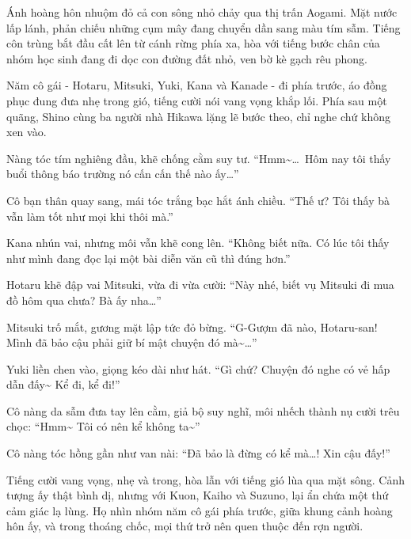 \documentclass[../main.tex]{subfiles}
\begin{document}

Ánh hoàng hôn nhuộm đỏ cả con sông nhỏ chảy qua thị trấn Aogami. Mặt nước lấp lánh, phản chiếu những cụm mây đang chuyển dần sang màu tím sẫm. Tiếng côn trùng bắt đầu cất lên từ cánh rừng phía xa, hòa với tiếng bước chân của nhóm học sinh đang đi dọc con đường đất nhỏ, ven bờ kè gạch rêu phong.

Năm cô gái - Hotaru, Mitsuki, Yuki, Kana và Kanade - đi phía trước, áo đồng phục đung đưa nhẹ trong gió, tiếng cười nói vang vọng khắp lối. Phía sau một quãng, Shino cùng ba người nhà Hikawa lặng lẽ bước theo, chỉ nghe chứ không xen vào.

Nàng tóc tím nghiêng đầu, khẽ chống cằm suy tư. ``Hmm\~{}\dots\ Hôm nay tôi thấy buổi thông báo trường nó cấn cấn thế nào ấy\dots''

Cô bạn thân quay sang, mái tóc trắng bạc hắt ánh chiều. ``Thế ư? Tôi thấy bà vẫn làm tốt như mọi khi thôi mà.''

Kana nhún vai, nhưng môi vẫn khẽ cong lên. ``Không biết nữa. Có lúc tôi thấy như mình đang đọc lại một bài diễn văn cũ thì đúng hơn.''


Hotaru khẽ đập vai Mitsuki, vừa đi vừa cười: ``Này nhé, biết vụ Mitsuki đi mua đồ hôm qua chưa? Bà ấy nha\dots''

Mitsuki trố mắt, gương mặt lập tức đỏ bừng. ``G-Gượm đã nào, Hotaru-san! Mình đã bảo cậu phải giữ bí mật chuyện đó mà\~{}\dots''

Yuki liền chen vào, giọng kéo dài như hát. ``Gì chứ? Chuyện đó nghe có vẻ hấp dẫn đấy\~{} Kể đi, kể đi!''

Cô nàng da sẫm đưa tay lên cằm, giả bộ suy nghĩ, môi nhếch thành nụ cười trêu chọc: ``Hmm\~{} Tôi có nên kể không ta\~{}''

Cô nàng tóc hồng gần như van nài: ``Đã bảo là đừng có kể mà\dots! Xin cậu đấy!''


Tiếng cười vang vọng, nhẹ và trong, hòa lẫn với tiếng gió lùa qua mặt sông. Cảnh tượng ấy thật bình dị, nhưng với Kuon, Kaiho và Suzuno, lại ẩn chứa một thứ cảm giác lạ lùng. Họ nhìn nhóm năm cô gái phía trước, giữa khung cảnh hoàng hôn ấy, và trong thoáng chốc, mọi thứ trở nên quen thuộc đến rợn người.
\end{document}
